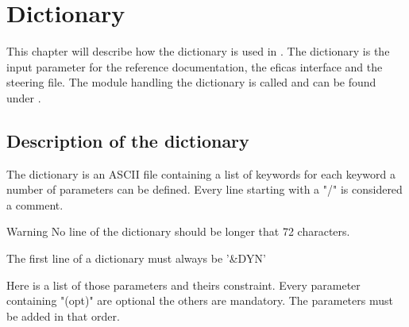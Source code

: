 \chapter{Dictionary}

This chapter will describe how the dictionary is used in \telemacsystem. The
dictionary is the input parameter for the reference documentation, the eficas
interface and the steering file. The module handling the dictionary is called
\damocles and can be found under .

\section{Description of the dictionary}
\label{ref:descDico}
The dictionary is an ASCII file containing a list of keywords for each keyword
a number of parameters can be defined. Every line starting with a "/" is
considered a comment.\\
\begin{WarningBlock}{Warning}
No line of the dictionary should be longer that 72 characters.
\end{WarningBlock}

The first line of a dictionary must always be '\&DYN'

Here is a list of those parameters and theirs constraint. Every parameter
containing "(opt)" are optional the others are mandatory. The parameters must
be added in that order.

